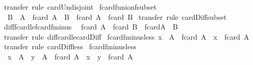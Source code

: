 \begin{isabellebody}
%
\isadelimproof
%
\endisadelimproof
%
\isatagproof
{}\isamarkupfalse%
\ transfer\ {\isacharparenleft}rule\ card{\isacharunderscore}Un{\isacharunderscore}disjoint{\isacharparenright}%
\endisatagproof
{\isafoldproof}%
%
\isadelimproof
\isanewline
%
\endisadelimproof
\isanewline
{}\isamarkupfalse%
\ fcard{\isacharunderscore}funion{\isacharunderscore}fsubset{\isacharcolon}\isanewline
\ \ {\isachardoublequoteopen}B\ {\isacharbar}{\isasymsubseteq}{\isacharbar}\ A\ {\isasymLongrightarrow}\ fcard\ {\isacharparenleft}A\ {\isacharbar}{\isacharminus}{\isacharbar}\ B{\isacharparenright}\ {\isacharequal}\ fcard\ A\ {\isacharminus}\ fcard\ B{\isachardoublequoteclose}\isanewline
%
\isadelimproof
%
\endisadelimproof
%
\isatagproof
{}\isamarkupfalse%
\ transfer\ {\isacharparenleft}rule\ card{\isacharunderscore}Diff{\isacharunderscore}subset{\isacharparenright}%
\endisatagproof
{\isafoldproof}%
%
\isadelimproof
\isanewline
%
\endisadelimproof
\isanewline
{}\isamarkupfalse%
\ diff{\isacharunderscore}fcard{\isacharunderscore}le{\isacharunderscore}fcard{\isacharunderscore}fminus{\isacharcolon}\isanewline
\ \ {\isachardoublequoteopen}fcard\ A\ {\isacharminus}\ fcard\ B\ {\isasymle}\ fcard{\isacharparenleft}A\ {\isacharbar}{\isacharminus}{\isacharbar}\ B{\isacharparenright}{\isachardoublequoteclose}\isanewline
%
\isadelimproof
%
\endisadelimproof
%
\isatagproof
{}\isamarkupfalse%
\ transfer\ {\isacharparenleft}rule\ diff{\isacharunderscore}card{\isacharunderscore}le{\isacharunderscore}card{\isacharunderscore}Diff{\isacharparenright}%
\endisatagproof
{\isafoldproof}%
%
\isadelimproof
\isanewline
%
\endisadelimproof
\isanewline
{}\isamarkupfalse%
\ fcard{\isacharunderscore}fminus{}{\isacharunderscore}less{\isacharcolon}\ {\isachardoublequoteopen}x\ {\isacharbar}{\isasymin}{\isacharbar}\ A\ {\isasymLongrightarrow}\ fcard\ {\isacharparenleft}A\ {\isacharbar}{\isacharminus}{\isacharbar}\ {\isacharbraceleft}{\isacharbar}x{\isacharbar}{\isacharbraceright}{\isacharparenright}\ {\isacharless}\ fcard\ A{\isachardoublequoteclose}\isanewline
%
\isadelimproof
%
\endisadelimproof
%
\isatagproof
{}\isamarkupfalse%
\ transfer\ {\isacharparenleft}rule\ card{\isacharunderscore}Diff{}{\isacharunderscore}less{\isacharparenright}%
\endisatagproof
{\isafoldproof}%
%
\isadelimproof
\isanewline
%
\endisadelimproof
\isanewline
{}\isamarkupfalse%
\ fcard{\isacharunderscore}fminus{}{\isacharunderscore}less{\isacharcolon}\isanewline
\ \ {\isachardoublequoteopen}x\ {\isacharbar}{\isasymin}{\isacharbar}\ A\ {\isasymLongrightarrow}\ y\ {\isacharbar}{\isasymin}{\isacharbar}\ A\ {\isasymLongrightarrow}\ fcard\ {\isacharparenleft}A\ {\isacharbar}{\isacharminus}{\isacharbar}\ {\isacharbraceleft}{\isacharbar}x{\isacharbar}{\isacharbraceright}\ {\isacharbar}{\isacharminus}{\isacharbar}\ {\isacharbraceleft}{\isacharbar}y{\isacharbar}{\isacharbraceright}{\isacharparenright}\ {\isacharless}\ fcard\ A{\isachardoublequoteclose}\isanewline

\end{isabellebody}
